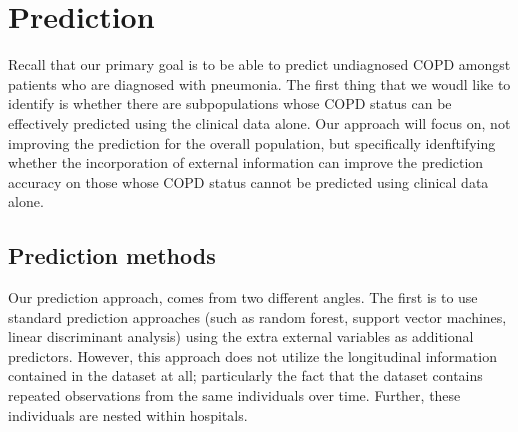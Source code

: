 \documentclass{article}
\begin{document}
%

\section{Prediction}

Recall that our primary goal is to be able to predict undiagnosed COPD amongst patients who are diagnosed with pneumonia. The first thing that we woudl like to identify is whether there are subpopulations whose COPD status can be effectively predicted using the clinical data alone. Our approach will focus on, not improving the prediction for the overall population, but specifically idenftifying whether the incorporation of external information can improve the prediction accuracy on those whose COPD status cannot be predicted using clinical data alone.




\subsection{Prediction methods}
Our prediction approach, comes from two different angles. The first is to use standard prediction approaches (such as random forest, support vector machines, linear discriminant analysis) using the extra external variables as additional predictors. However, this approach does not utilize the longitudinal information contained in the dataset at all; particularly the fact that the dataset contains repeated observations from the same individuals over time. Further, these individuals are nested within hospitals. 
\end{document}
